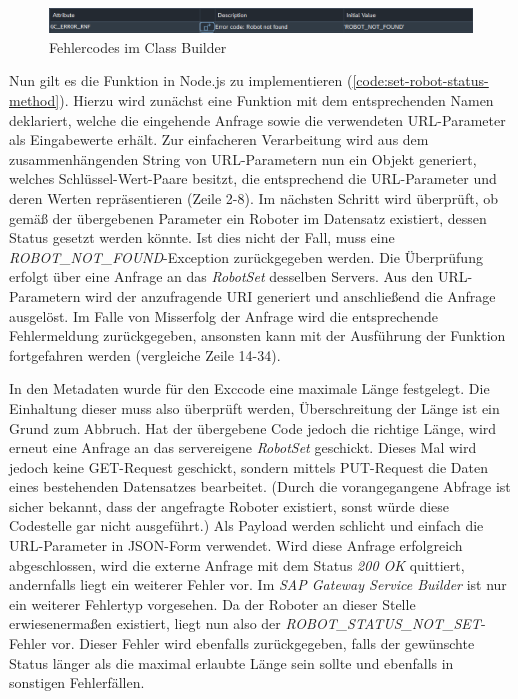 \begin{figure}[!ht]
	\centering
	\includegraphics[width=\textwidth]{Bilder/ABAP/2020-12-04 10_22_23-Class Builder_ Display Class ZCL_ZEWM_ROBCO_DPC_EXT_cut.png}
	\caption{Fehlercodes im Class Builder}
	\label{fig:class-builder}
\end{figure}

Nun gilt es die Funktion in Node.js zu implementieren (\autoref{code:set-robot-status-method}).
Hierzu wird zunächst eine Funktion mit dem entsprechenden Namen deklariert, welche die eingehende Anfrage sowie die verwendeten URL-Parameter als Eingabewerte erhält.
Zur einfacheren Verarbeitung wird aus dem zusammenhängenden String von URL-Parametern nun ein Objekt generiert, welches Schlüssel-Wert-Paare besitzt, die entsprechend die URL-Parameter und deren Werten repräsentieren (Zeile 2-8).
Im nächsten Schritt wird überprüft, ob gemäß der übergebenen Parameter ein Roboter im Datensatz existiert, dessen Status gesetzt werden könnte.
Ist dies nicht der Fall, muss eine \emph{ROBOT\_NOT\_FOUND}-Exception zurückgegeben werden.
Die Überprüfung erfolgt über eine Anfrage an das \emph{RobotSet} desselben Servers.
Aus den URL-Parametern wird der anzufragende \ac{URI} generiert und anschließend die Anfrage ausgelöst.
Im Falle von Misserfolg der Anfrage wird die entsprechende Fehlermeldung zurückgegeben, ansonsten kann mit der Ausführung der Funktion fortgefahren werden (vergleiche Zeile 14-34).

In den Metadaten wurde für den Exccode eine maximale Länge festgelegt.
Die Einhaltung dieser muss also überprüft werden, Überschreitung der Länge ist ein Grund zum Abbruch.
Hat der übergebene Code jedoch die richtige Länge, wird erneut eine Anfrage an das servereigene \emph{RobotSet} geschickt.
Dieses Mal wird jedoch keine GET-Request geschickt, sondern mittels PUT-Request die Daten eines bestehenden Datensatzes bearbeitet.
(Durch die vorangegangene Abfrage ist sicher bekannt, dass der angefragte Roboter existiert, sonst würde diese Codestelle gar nicht ausgeführt.)
Als Payload werden schlicht und einfach die URL-Parameter in \ac{JSON}-Form verwendet.
Wird diese Anfrage erfolgreich abgeschlossen, wird die externe Anfrage mit dem Status \emph{200 OK} quittiert, andernfalls liegt ein weiterer Fehler vor.
Im \emph{SAP Gateway Service Builder} ist nur ein weiterer Fehlertyp vorgesehen.
Da der Roboter an dieser Stelle erwiesenermaßen existiert, liegt nun also der \emph{ROBOT\_STATUS\_NOT\_SET}-Fehler vor.
Dieser Fehler wird ebenfalls zurückgegeben, falls der gewünschte Status länger als die maximal erlaubte Länge sein sollte und ebenfalls in sonstigen Fehlerfällen.

